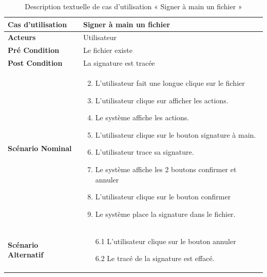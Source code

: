 \begin{longtable}{|p{5cm}|p{10cm}|}
  \caption{Description textuelle de cas d'utilisation « Signer à main un fichier »} \label{tab:description-textuelle-de-cas-d-utilisation-signer-a-main-un-fichier} \\
\hline
\textbf{Cas d'utilisation}&Signer à main un fichier\\
\hline
\textbf{Acteurs}&Utilisateur\\
\hline
\textbf{Pré Condition}&Le fichier existe\\
\hline
\textbf{Post Condition}&La signature est tracée\\
\hline
\textbf{Scénario Nominal}&
\vspace{-\baselineskip}
\begin{enumerate}
    \setcounter{enumi}{1}
  \item L'utilisateur fait une longue clique sur le fichier
  \item L'utilisateur clique sur afficher les actions.
  \item Le système affiche les actions.
  \item L'utilisateur clique sur le bouton signature à main.
  \item L'utilisateur trace sa signature.
  \item Le système affiche les 2 boutons confirmer et annuler
  \item L'utilisateur clique sur le bouton confirmer
  \item Le système place la signature dans le fichier.
\end{enumerate}\\
\hline
\textbf{Scénario Alternatif}&
\vspace{-\baselineskip}
\begin{enumerate}
    \item [6.1]L'utilisateur clique sur le bouton annuler
    \item [6.2]Le tracé de la signature est effacé.
\end{enumerate}\\
\hline

\end{longtable}



